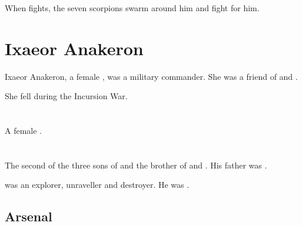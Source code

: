 When \Nechsain{} fights, the seven scorpions swarm around him and fight for him.















\section{Ixaeor Anakeron}
Ixaeor Anakeron, a female \dragon, was a military commander. She was a friend of \Nexagglachel and \Iscrafel.

She fell during the Incursion War.














\section[Laccashyth]{\Laccashyth}
A female \dragon. 















\section{\QuessanthIshnaruchaefir}
\index{\Ishnaruchaefir}
\index{\QuessanthIshnaruchaefir}
The second of the three sons of \Tiamat and the brother of \Nexagglachel{} and \Secherdamon.
His father was \Iurzmacul. 

\Ishnaruchaefir{} was an explorer, unraveller and destroyer. 
He was . 









\subsection{Arsenal}






